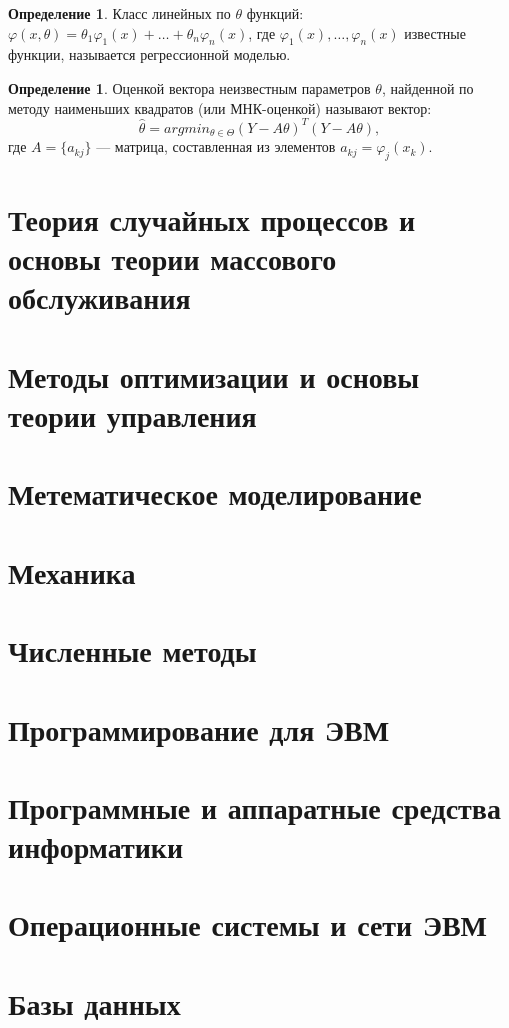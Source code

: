 \documentclass[12pt]{report}
\theoremstyle{definition}
\newtheorem{definition}[theorem]{Определение}
\begin{document}
\begin{definition}
Класс линейных по $\theta$ функций:
$\varphi(x, \theta) = \theta_1 \varphi_1(x) + \dots + \theta_n \varphi_n(x)$,
где $\varphi_1(x), \dots, \varphi_n(x)$ известные функции, называется регрессионной моделью.
\end{definition}

\begin{definition}
Оценкой вектора неизвестным параметров $\theta$, найденной по методу
наименьших квадратов (или МНК-оценкой) называют вектор:
$$
\hat{\theta} = argmin_{\theta \in \Theta} (Y - A \theta)^T (Y - A \theta),
$$ где $A = \{a_{kj}\}$ --- матрица, составленная из элементов
$a_{kj} = \varphi_j(x_k)$.
\end{definition}


\chapter{Теория случайных процессов и основы теории массового обслуживания}

\chapter{Методы оптимизации и основы теории управления}

\chapter{Метематическое моделирование}

\chapter{Механика}

\chapter{Численные методы}

\chapter{Программирование для ЭВМ}

\chapter{Программные и аппаратные средства информатики}

\chapter{Операционные системы и сети ЭВМ}

\chapter{Базы данных}
\end{document}
